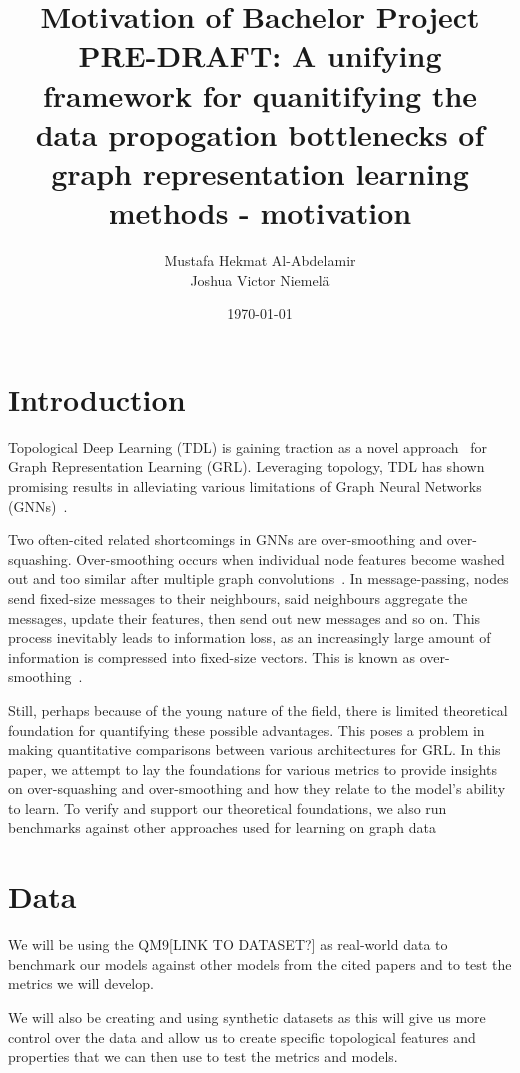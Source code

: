 \documentclass[a4paper,12pt]{article}
\title{Motivation of Bachelor Project PRE-DRAFT: A unifying framework for quanitifying the data propogation bottlenecks of graph representation learning methods - motivation}
\author{
	\color{red}  Mustafa Hekmat Al-Abdelamir\\
	\color{red}  Joshua Victor Niemelä\\
}
\date{\today}
\begin{document}
\maketitle



\section{Introduction}

Topological Deep Learning (TDL) is gaining traction as a novel approach~\cite{papamarkou_position:_2024} for Graph Representation Learning (GRL).
Leveraging topology, TDL has shown promising results in alleviating various limitations of Graph Neural Networks (GNNs)~\cite{horn_topological_2022}.

Two often-cited related\cite{giraldo_trade-off_2023} shortcomings in GNNs are over-smoothing and over-squashing.
Over-smoothing occurs when individual node features become washed out and too similar after multiple graph convolutions~\cite{li_deeper_2018}.
In message-passing, nodes send fixed-size messages to their neighbours, said neighbours aggregate the messages, update their features, then send out new messages and so on.
This process inevitably leads to information loss, as an increasingly large amount of information is compressed into fixed-size vectors.
This is known as over-smoothing~\cite{alon_bottleneck_2021}.

Still, perhaps because of the young nature of the field, there is limited theoretical foundation for quantifying these possible advantages.
This poses a problem in making quantitative comparisons between various architectures for GRL.
In this paper, we attempt to lay the foundations for various metrics to provide insights on over-squashing and over-smoothing and how they relate to the model's ability to learn.
To verify and support our theoretical foundations, we also run benchmarks against other approaches used for learning on graph data~\cite{horn_topological_2022}

\section{Data}
We will be using the QM9[LINK TO DATASET?] as real-world data to benchmark our models against
other models from the cited papers and to test the metrics we will develop.

We will also be creating and using synthetic datasets as this will give us more control over the data and allow us to create specific topological features and properties that we can then use to test the metrics and models.
\end{document}
